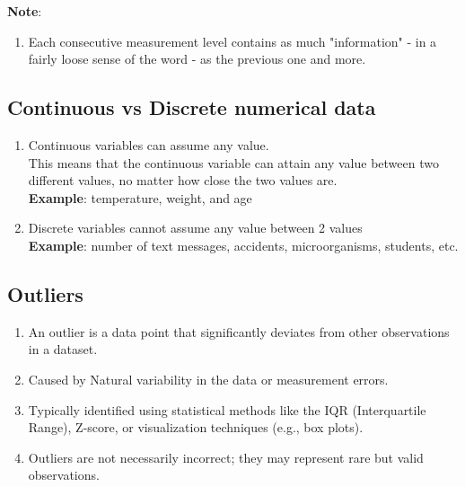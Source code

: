 \vspace{0.3cm}

\textbf{Note}:
\begin{enumerate}
    \item Each consecutive measurement level contains as much "information" - in a fairly loose sense of the word - as the previous one and more. \cite{statistics/book/Statistics-for-Data-Scientists/Maurits-Kaptein}
\end{enumerate}


\subsection{Continuous vs Discrete numerical data \cite{statistics/book/Statistics-for-Data-Scientists/Maurits-Kaptein}}\label{Data/Measurement-Levels/Continuous vs Discrete numerical data}

\label{Data/Measurement-Levels/Continuous vs Discrete numerical data/Continuous numerical data}
\label{Data/Measurement-Levels/Continuous vs Discrete numerical data/Discrete numerical data}

\begin{enumerate}
    \item Continuous variables can assume any value.\\
    This means that the continuous variable can attain any value between two different values, no matter how close the two values are.\\
    \textbf{Example}: temperature, weight, and age

    \item Discrete variables cannot assume any value between 2 values\\
    \textbf{Example}: number of text messages, accidents, microorganisms, students, etc.
\end{enumerate}


\subsection{Outliers \cite{statistics/book/Statistics-for-Data-Scientists/Maurits-Kaptein}}\label{Data/Measurement-Levels/Outliers}

\begin{enumerate}
    \item An outlier is a data point that significantly deviates from other observations in a dataset. \cite{common/online/chatgpt}

    \item Caused by Natural variability in the data or measurement errors. \cite{common/online/chatgpt}

    \item Typically identified using statistical methods like the IQR (Interquartile Range), Z-score, or visualization techniques (e.g., box plots). \cite{common/online/chatgpt}

    \item Outliers are not necessarily incorrect; they may represent rare but valid observations. \cite{common/online/chatgpt}
    
\end{enumerate}


